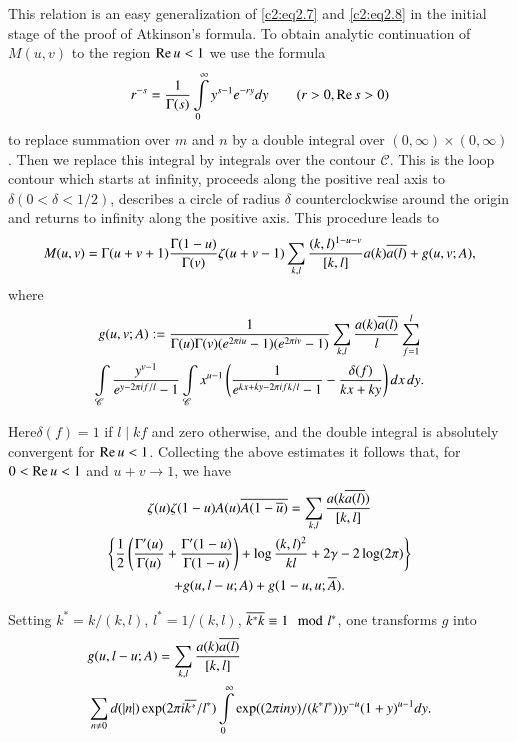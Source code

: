 This relation is an easy generalization of \eqref{c2:eq2.7} and
\eqref{c2:eq2.8}  in the initial stage of the proof of Atkinson's
formula. To obtain analytic continuation of $M(u, v)$ to the region
$\operatorname{Re} u< 1$ we use the formula
$$
r^{-s} = \frac{1}{\Gamma(s)} \int\limits_0^\infty y^{s-1} e^{-ry} dy
\qquad (r> 0, \operatorname{Re} s > 0)
$$
to replace summation over $m$ and $n$ by a double integral over $(0 ,
\infty) \times (0, \infty)$. Then we replace this integral by
integrals over the contour $\mathscr{C}$. This is the loop contour
which starts at infinity, proceeds along the positive real axis to
$\delta(0 < \delta < 1/2)$, describes a circle of radius $\delta$
counterclockwise around the origin and returns to infinity along the
positive axis. This procedure leads to 
{\fontsize{10}{12}\selectfont
$$
M(u, v) = \Gamma (u+ v+1) \frac{\Gamma (1-u)}{\Gamma (v)} \zeta (u+
v-1) \sum_{k, l} \frac{(k, l)^{1- u-v}}{[k, l]} a(k) \overline{a(l)}+ g(u,
v; A),
$$}
where
\begin{multline*}
   g(u, v; A): = \frac{1}{\Gamma (u) \Gamma(v) (e^{2 \pi i u}-1) (e^{2
      \pi i v}-1)} \sum_{k, l} \frac{a(k) \overline{a(l)}}{l} \sum_{f=1}^l\\
  \int\limits_{\mathscr{C}} \frac{y^{v-1}}{e^{y- 2 \pi i f/l}-1}
  \int\limits_{\mathscr{C}} x^{u-1} \left(\frac{1}{e^{kx+ky-2\pi i
      fk/l}-1}- \frac{\delta (f)}{kx+ ky}\right) dx\, dy. 
\end{multline*}

Here\pageoriginale $\delta(f) =1$ if $l\mid kf$ and zero otherwise,
and the double integral is absolutely convergent for $\operatorname{Re} u <
1$. Collecting the above estimates it follows that, for $0 < \operatorname{Re} u <
1$ and $u+ v\to 1$, we have 
\begin{multline*}
  \zeta (u) \zeta (1-u) A(u) \overline{A (1- \overline{u})}= \sum_{k, l} \frac{a
    (k \overline{a(l)})}{[k, l]} \\
  \left\{\frac{1}{2} \left( \frac{\Gamma' (u)}{\Gamma (u)} +
  \frac{\Gamma' (1-u)}{\Gamma (1-u)}\right)  + \log \frac{(k,
    l)^2}{kl} + 2 \gamma - 2 \log (2 \pi)\right\}\\
  + g(u, l - u; A) + g(1- u, u; \overline{A}).
\end{multline*}

Setting $k^* = k/(k, l)$, $l^* = 1/(k, l)$, $\overline{k^* k}\equiv 1 \mod
l^*$, one transforms $g$ into
\begin{align}
  & g(u, l - u; A)= \sum_{k, l} \frac{a(k) \overline{a(l)}}{[k,
      l]}\label{c2:eq2.131}\\ 
  & \sum_{n \neq 0} d(|n|) \exp (2 \pi i \overline{k^*}/l^*)
  \int\limits_0^\infty \exp((2 \pi i ny)/(k^* l^*)) y^{-u} (1+
  y)^{u-1} dy.\notag
\end{align}

